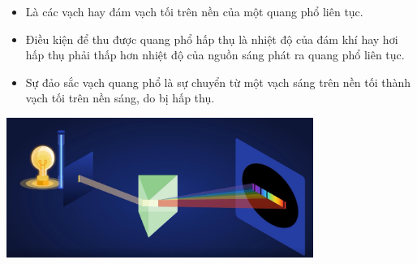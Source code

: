 	\begin{itemize}

	 	\item Là các vạch hay đám vạch tối trên nền của một quang phổ liên tục.

 		\item Điều kiện để thu được quang phổ hấp thụ là nhiệt độ của đám khí hay hơi hấp thụ phải thấp hơn nhiệt độ của nguồn sáng phát ra quang phổ liên tục.

 		\item Sự đảo sắc vạch quang phổ là sự chuyển từ một vạch sáng trên nền tối thành vạch tối trên nền sáng, do bị hấp thụ.
 	\end{itemize}
\begin{center}
	\includegraphics[width=10cm]{../figs/VN12-PH-36-L-021-2-3.JPG}
\end{center}
